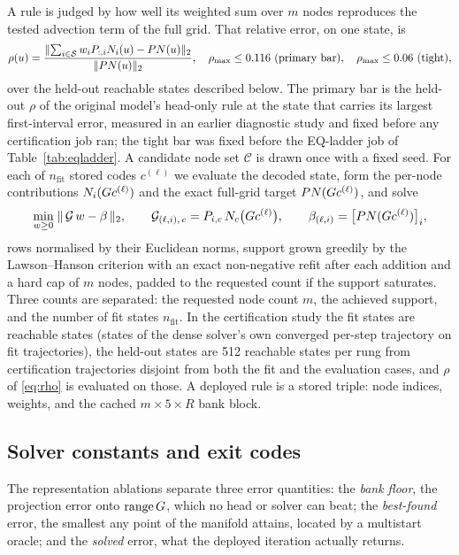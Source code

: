 A rule is judged by how well its weighted sum over $m$ nodes reproduces
the tested advection term of the full grid. That relative error, on one
state, is
\begin{equation}
  \rho(u)=\frac{\lVert \sum_{i\in\mathcal S}w_iP_{:,i}N_i(u)-P N(u) \rVert_2}{\lVert P N(u) \rVert_2},
  \quad
  \rho_{\max}\le0.116\ \text{(primary bar)},\quad \rho_{\max}\le0.06\ \text{(tight)},
  \label{eq:rho}
\end{equation}
over the held-out reachable states described below. The primary bar is
the held-out $\rho$ of the original model's head-only rule at the state that
carries its largest first-interval error, measured in an earlier diagnostic
study and fixed before any certification job ran; the tight bar was fixed
before the EQ-ladder job of Table~\ref{tab:eqladder}. A candidate node set $\mathcal C$ is drawn once with a fixed seed. For each of
$n_{\text{fit}}$ stored codes $c^{(\ell)}$ we evaluate the decoded state, form
the per-node contributions $N_i(G c^{(\ell)})$ and the exact full-grid
target $P N(G c^{(\ell)})$, and solve
\begin{equation}
  \min_{w\ge 0}\;
  \lVert \,\mathcal{G}\,w-\beta\, \rVert_2,
  \qquad
  \mathcal{G}_{(\ell,i),\,c}=P_{i,c}\,N_c\big(G c^{(\ell)}\big),
  \qquad
  \beta_{(\ell,i)}=\big[P N(G c^{(\ell)})\big]_i ,
  \label{eq:nnls}
\end{equation}
rows normalised by their Euclidean norms, support grown greedily by the
Lawson--Hanson criterion with an exact non-negative refit after each addition
and a hard cap of $m$ nodes, padded to the requested count if the support
saturates. Three counts are separated: the requested node count $m$, the
achieved support, and the number of fit states $n_{\text{fit}}$. In the
certification study the fit states are reachable states (states of the dense
solver's own converged per-step trajectory on fit trajectories), the held-out
states are 512 reachable states per rung from certification trajectories
disjoint from both the fit and the evaluation cases, and $\rho$ of
\eqref{eq:rho} is evaluated on those. A deployed rule is a stored triple: node
indices, weights, and the cached $m\times5\times R$ bank block.

\subsection{Solver constants and exit codes}
\label{app:method:codes}
The representation ablations separate three error quantities: the
\emph{bank floor}, the projection error onto $\operatorname{range}G$,
which no head or solver can beat; the \emph{best-found} error, the
smallest any point of the manifold attains, located by a multistart
oracle; and the \emph{solved} error, what the deployed
iteration actually returns.


